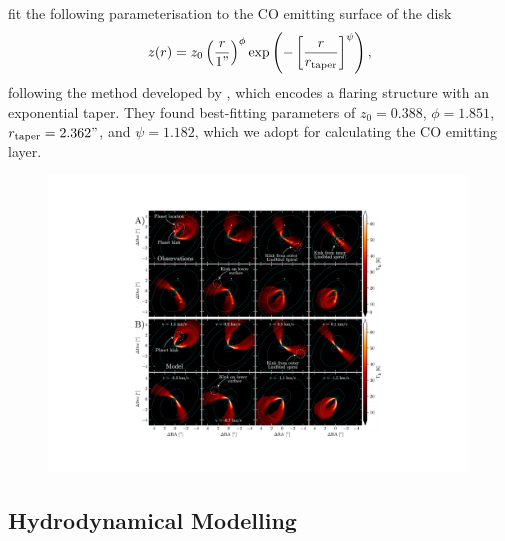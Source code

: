 \citet{law2021a} fit the following parameterisation to the CO emitting surface of the disk
\begin{align}
    z(r) = z_0 \left( \frac{r}{1"} \right)^\phi \exp \left( -\left[ \frac{r}{r_\mathrm{taper}} \right]^{\psi} \right), \label{eq:height}
\end{align}
following the method developed by \citet{pinte2018}, which encodes a flaring structure with an exponential taper.
They found best-fitting parameters of $z_0 = 0.388$, $\phi = 1.851$, $r_\textrm{taper} = 2.362"$, and $\psi = 1.182$, which we adopt for calculating the CO emitting layer.

\begin{figure}
    \centering
    \includegraphics[width = 0.99\textwidth]{figures/calcino_sims.pdf}
    \caption{}
    \label{fig:calcino_channels}
\end{figure}

\subsection{Hydrodynamical Modelling}

